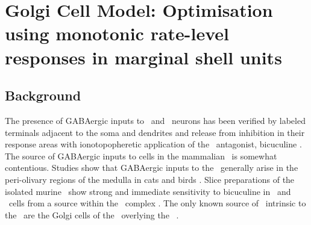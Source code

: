 

\section[GLG Cell Model]{Golgi Cell Model: Optimisation using monotonic
  rate-level responses in marginal shell units}\label{sec:GolgiCellModel}

\subsection{Background}\label{sec:Golgi:background}

The presence of GABAergic inputs to \VCN~and \DCN~neurons has been verified by
labeled terminals adjacent to the soma and dendrites
\citep{SmithRhode:1989,AwatramaniTurecekEtAl:2005,BabalianRyugoEtAl:2003} and
release from inhibition in their response areas with ionotopopheretic
application of the \GABAa~antagonist, bicuculine
\citep{EvansZhao:1998,CasparyBackoffEtAl:1994,BackoffShadduckEtAl:1999,FerragamoGoldingEtAl:1998a}. The
source of GABAergic inputs to cells in the mammalian \CN~is somewhat
contentious. Studies show that GABAergic inputs to the \CN~generally arise in
the peri-olivary regions of the medulla in cats \citep{OstapoffBensonEtAl:1997}
and birds \citep{LachicaRubsamenEtAl:1995,YangMonsivaisEtAl:1999}. Slice
preparations of the isolated murine \VCN~show strong and immediate sensitivity
to bicuculine in \TS~and \DS~cells from a source within the \CN~complex
\citep{FerragamoGoldingEtAl:1998a}.  The only known source of \GABA~intrinsic to
the \VCN~are the Golgi cells of the \GCD~overlying the
\VCN~\citep[Fig.~\ref{fig:CNdiagram}]{Mugnaini:1985,FerragamoGoldingEtAl:1998}. 




